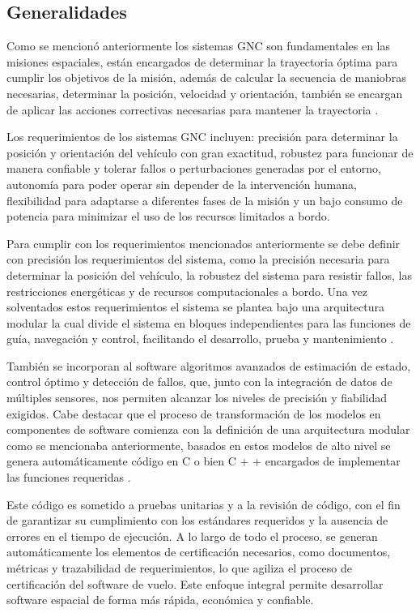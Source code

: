 \documentclass[12pt]{article}
\begin{document}
\subsection{Generalidades}

Como se mencionó anteriormente los sistemas GNC son fundamentales en las misiones espaciales, están encargados de determinar la trayectoria óptima para cumplir los objetivos de la misión, además de calcular la secuencia de maniobras necesarias, determinar la posición, velocidad y orientación, también se encargan de aplicar las acciones correctivas necesarias para mantener la trayectoria \cite{hewing2023enhancing}.

Los requerimientos de los sistemas GNC incluyen: precisión para determinar la posición y orientación del vehículo con gran exactitud, robustez para funcionar de manera confiable y tolerar fallos o perturbaciones generadas por el entorno, autonomía para poder operar sin depender de la intervención humana, flexibilidad para adaptarse a diferentes fases de la misión y un bajo consumo de potencia para minimizar el uso de los recursos limitados a bordo. 

Para cumplir con los requerimientos mencionados anteriormente se debe definir con precisión los requerimientos del sistema, como la precisión necesaria para determinar la posición del vehículo, la robustez del sistema para resistir fallos, las restricciones energéticas y de recursos computacionales a bordo. Una vez solventados estos requerimientos el sistema se plantea bajo una arquitectura modular la cual divide el sistema en bloques independientes para las funciones de guía, navegación y control, facilitando el desarrollo, prueba y mantenimiento \cite{AEM2017}. 

También se incorporan al software algoritmos avanzados de estimación de estado, control óptimo y detección de fallos, que, junto con la integración de datos de múltiples sensores, nos permiten alcanzar los niveles de precisión y fiabilidad exigidos. Cabe destacar que el proceso de transformación de los modelos en componentes de software comienza con la definición de una arquitectura modular como se mencionaba anteriormente, basados en estos modelos de alto nivel se genera automáticamente código en C o bien C + + encargados de implementar las funciones requeridas \cite{MathWorks2024}. 

Este código es sometido a pruebas unitarias y a la revisión de código, con el fin de garantizar su cumplimiento con los estándares requeridos y la ausencia de errores en el tiempo de ejecución. A lo largo de todo el proceso, se generan automáticamente los elementos de certificación necesarios, como documentos, métricas y trazabilidad de requerimientos, lo que agiliza el proceso de certificación del software de vuelo. Este enfoque integral permite desarrollar software espacial de forma más rápida, económica y confiable.
\end{document}
